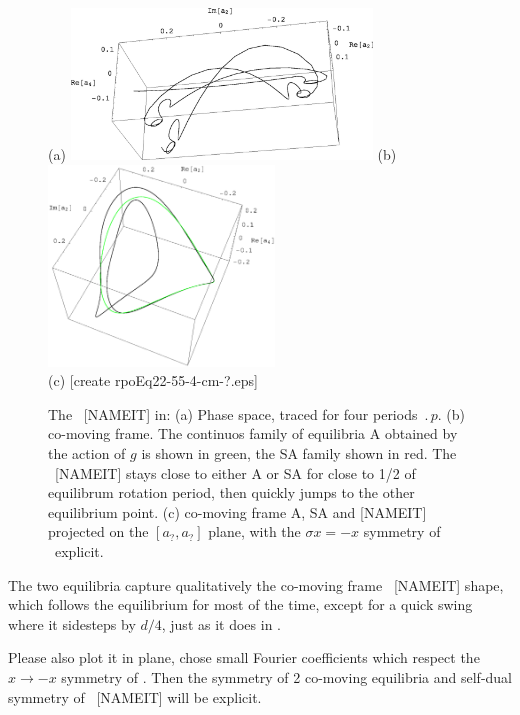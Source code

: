 \begin{figure}[t] %
\centering
(a) \includegraphics[width=8.0cm]{figs/rpo22-55-4-clean.eps}
%
\hspace{0.1in}
(b) \includegraphics[width=6.0cm]{figs/rpoEq22-55-4-cm.eps}
\\
(c) [create rpoEq22-55-4-cm-?.eps]
\caption{
 The \rpo\ [NAMEIT] in: 
 (a) Phase space, traced for four periods $\period{p}$.
 (b) co-moving frame. 
        The continuos family of 
	equilibria A obtained by the action of $g$ is shown in green,
	the SA family shown in red. The \rpo\ [NAMEIT] stays close
	to either A or SA for close to 1/2 of equilibrum rotation
	period, then quickly jumps to the other equilibrium point.
 (c) co-moving frame A, SA and [NAMEIT] projected on the 
	$[a_?,a_?]$ plane,
	with the $\sigma x = -x$ symmetry of \KSe\ explicit.
        }
\label{f:rpoNAMEIT}
\end{figure}


The two equilibria
capture qualitatively the co-moving frame \rpo\ [NAMEIT] shape,
which follows the
equilibrium for most of the time, except for a quick swing where it
sidesteps by $d/4$, just as it does in . 

Please also plot it in plane, chose small Fourier coefficients
 which respect the $x \to -x$ symmetry of \KSe.
Then the symmetry of 2 co-moving
equilibria and self-dual symmetry of \rpo\ [NAMEIT] will be explicit.

